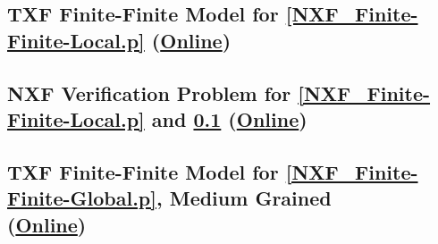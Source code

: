 \documentclass{easychair}
\begin{document}
\newpage
\subsection{TXF Finite-Finite Model for \ref{NXF_Finite-Finite-Local.p}
(\href{https://raw.githubusercontent.com/GeoffsPapers/InterpretationFormat/master/Examples/NXF_Finite-Finite-Local.s}{Online})}
\label{NXF_Finite-Finite-Local.s}
\begin{small}

\end{small}

\newpage
\subsection{NXF Verification Problem for \ref{NXF_Finite-Finite-Local.p} and
\ref{NXF_Finite-Finite-Local.s}
(\href{https://raw.githubusercontent.com/GeoffsPapers/InterpretationFormat/master/Examples/NXF_Finite-Finite-Local.s.p}{Online})}
\label{NXF_Finite-Finite-Local.s.p}
\begin{small}

\end{small}

% 

\newpage
\subsection{TXF Finite-Finite Model for \ref{NXF_Finite-Finite-Global.p}, Medium Grained \\
(\href{https://raw.githubusercontent.com/GeoffsPapers/InterpretationFormat/master/Examples/NXF_Finite-Finite-Global_Medium.s}{Online})}
\label{NXF_Finite-Finite-Global_Medium.s}
\begin{small}

\end{small}
\end{document}

